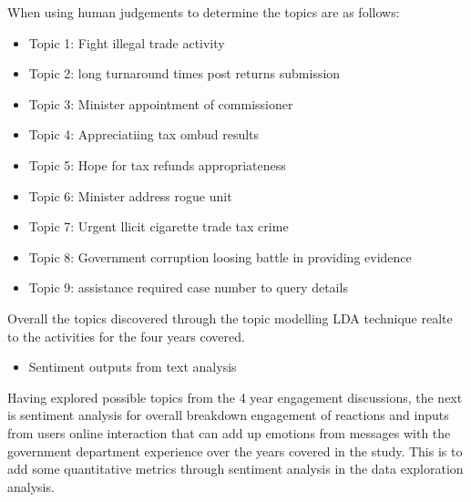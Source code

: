 When using human judgements to determine the topics are as follows:
\begin{itemize}
    \item Topic 1:  Fight illegal trade activity 
\end{itemize}
\begin{itemize}
    \item Topic 2: long turnaround times post returns submission
\end{itemize}
\begin{itemize}
    \item Topic 3: Minister appointment of commissioner
\end{itemize}
\begin{itemize}
    \item Topic 4:  Appreciatiing tax ombud results
\end{itemize}
\begin{itemize}
    \item Topic 5: Hope for tax refunds appropriateness
\end{itemize}
\begin{itemize}
    \item Topic 6: Minister address rogue unit 
\end{itemize}
\begin{itemize}
    \item Topic 7: Urgent llicit cigarette trade tax crime 
\end{itemize}
\begin{itemize}
    \item Topic 8: Government corruption loosing battle in providing evidence
\end{itemize}
\begin{itemize}
    \item Topic 9:  assistance required case number to query details 
\end{itemize}

Overall the topics discovered through the topic modelling LDA technique realte to the activities for the four years covered. 

\begin{itemize}
    \item Sentiment outputs from text analysis
\end{itemize}

Having explored possible topics from the 4 year engagement discussions, the next is sentiment analysis for overall breakdown engagement of reactions and inputs from users online interaction that can add up emotions from messages with the government department experience over the years covered in the study.  This is to add some quantitative metrics through sentiment analysis in the data exploration analysis.

